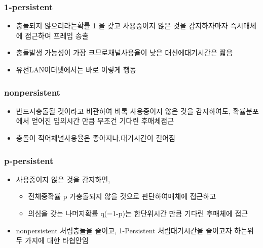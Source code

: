 \begin{multicols}{2}
\subsubsection*{1-persistent}
\vspace{-2mm}
\begin{itemize}
    \item 충돌되지 않으리라는확률 1 을 갖고 사용중이지 않은 것을 감지하자마자 즉시매체에 접근하여 프레임 송출\vspace{-2mm}
    \item 충돌발생 가능성이 가장 크므로채널사용율이 낮은 대신에대기시간은 짧음\vspace{-2mm}
    \item 유선LAN이더넷에서는 바로 이렇게 행동\vspace{-2mm}
\end{itemize}
\vspace{-2mm}
\subsubsection*{nonpersistent}
\vspace{-2mm}
\begin{itemize}
    \item 반드시충돌될 것이라고 비관하여 비록 사용중이지 않은 것을 감지하여도, 확률분포에서 얻어진 임의시간 만큼 무조건 기다린 후매체접근\vspace{-2mm}
    \item 충돌이 적어채널사용율은 좋아지나,대기시간이 길어짐\vspace{-2mm}
\end{itemize}
\vspace{-2mm}
\subsubsection*{p-persistent}
\vspace{-2mm}
\begin{itemize}
    \item 사용중이지 않은 것을 감지하면,\vspace{-2mm}
    \vspace{-2mm}
        \begin{itemize}
        \item 전체중확률 p 가충돌되지 않을 것으로 판단하여매체에 접근하고\vspace{-2mm}
        \item 의심을 갖는 나머지확률 q(=1-p)는 한단위시간 만큼 기다린 후매체에  접근\vspace{-2mm}
        \end{itemize}
        \vspace{-2mm}
    \item nonpersistent 처럼충돌을 줄이고, 1-Persistent 처럼대기시간을 줄이고자 하는위 두 가지에 대한 타협안임\vspace{-2mm}
\end{itemize}

\end{multicols}
